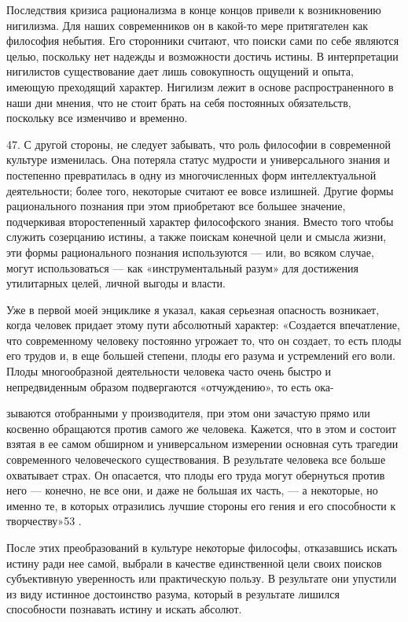 \documentclass[a5paper,10pt]{article}
\begin{document}
Последствия кризиса рационализма в конце концов привели к возникновению
нигилизма. Для наших современников он в какой-то мере притягателен как
философия небытия. Его сторонники считают, что поиски сами по себе являются
целью, поскольку нет надежды и возможности достичь истины. В интерпретации
нигилистов существование дает лишь совокупность ощущений и опыта, имеющую
преходящий характер. Нигилизм лежит в основе распространенного в наши дни
мнения, что не стоит брать на себя постоянных обязательств, поскольку все
изменчиво и временно.

47. С другой стороны, не следует забывать, что роль философии в современной
культуре изменилась. Она потеряла статус мудрости и универсального знания и
постепенно превратилась в одну из многочисленных форм интеллектуальной
деятельности; более того, некоторые считают ее вовсе излишней. Другие формы
рационального познания при этом приобретают все большее значение, подчеркивая
второстепенный характер философского знания. Вместо того чтобы служить
созерцанию истины, а также поискам конечной цели и смысла жизни, эти формы
рационального познания используются — или, во всяком случае, могут
использоваться — как «инструментальный разум» для достижения утилитарных целей,
личной выгоды и власти.

Уже в первой моей энциклике я указал, какая серьезная опасность возникает,
когда человек придает этому пути абсолютный характер: «Создается впечатление,
что современному человеку постоянно угрожает то, что он создает, то есть плоды
его трудов и, в еще большей степени, плоды его разума и устремлений его воли.
Плоды многообразной деятельности человека часто очень быстро и непредвиденным
образом подвергаются «отчуждению», то есть ока-

зываются отобранными у производителя, при этом они зачастую прямо или косвенно
обращаются против самого же человека. Кажется, что в этом и состоит взятая в ее
самом обширном и универсальном измерении основная суть трагедии современного
человеческого существования. В результате человека все больше охватывает страх.
Он опасается, что плоды его труда могут обернуться против него — конечно, не
все они, и даже не большая их часть, — а некоторые, но именно те, в которых
отразились лучшие стороны его гения и его способности к творчеству»53 .

После этих преобразований в культуре некоторые философы, отказавшись искать
истину ради нее самой, выбрали в качестве единственной цели своих поисков
субъективную уверенность или практическую пользу. В результате они упустили из
виду истинное достоинство разума, который в результате лишился способности
познавать истину и искать абсолют.
\end{document}
